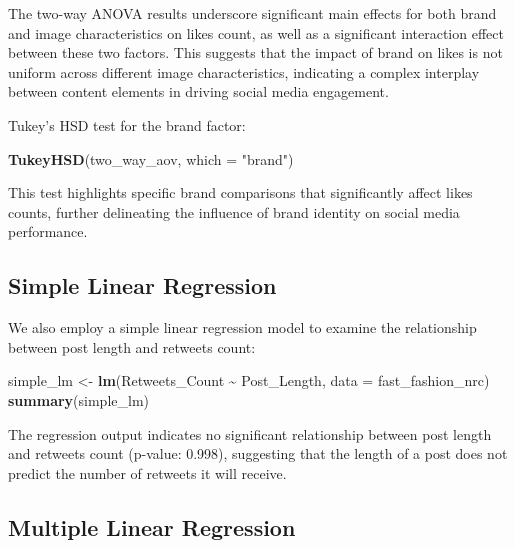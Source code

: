 \documentclass[
]{book}
\newenvironment{Shaded}{\begin{snugshade}}{\end{snugshade}}
\newcommand{\AttributeTok}[1]{\textcolor[rgb]{0.13,0.29,0.53}{#1}}
\newcommand{\FunctionTok}[1]{\textcolor[rgb]{0.13,0.29,0.53}{\textbf{#1}}}
\newcommand{\NormalTok}[1]{#1}
\newcommand{\OtherTok}[1]{\textcolor[rgb]{0.56,0.35,0.01}{#1}}
\newcommand{\SpecialCharTok}[1]{\textcolor[rgb]{0.81,0.36,0.00}{\textbf{#1}}}
\newcommand{\StringTok}[1]{\textcolor[rgb]{0.31,0.60,0.02}{#1}}
\begin{document}
The two-way ANOVA results underscore significant main effects for both brand and image characteristics on likes count, as well as a significant interaction effect between these two factors. This suggests that the impact of brand on likes is not uniform across different image characteristics, indicating a complex interplay between content elements in driving social media engagement.

Tukey's HSD test for the brand factor:

\begin{Shaded}
\begin{Highlighting}[]
\FunctionTok{TukeyHSD}\NormalTok{(two\_way\_aov, }\AttributeTok{which =} \StringTok{"brand"}\NormalTok{)}
\end{Highlighting}
\end{Shaded}

This test highlights specific brand comparisons that significantly affect likes counts, further delineating the influence of brand identity on social media performance.

\hypertarget{simple-linear-regression}{%
\subsection{Simple Linear Regression}\label{simple-linear-regression}}

We also employ a simple linear regression model to examine the relationship between post length and retweets count:

\begin{Shaded}
\begin{Highlighting}[]
\NormalTok{simple\_lm }\OtherTok{\textless{}{-}} \FunctionTok{lm}\NormalTok{(Retweets\_Count }\SpecialCharTok{\textasciitilde{}}\NormalTok{ Post\_Length, }\AttributeTok{data =}\NormalTok{ fast\_fashion\_nrc)}
\FunctionTok{summary}\NormalTok{(simple\_lm)}
\end{Highlighting}
\end{Shaded}

The regression output indicates no significant relationship between post length and retweets count (p-value: 0.998), suggesting that the length of a post does not predict the number of retweets it will receive.

\hypertarget{multiple-linear-regression}{%
\subsection{Multiple Linear Regression}\label{multiple-linear-regression}}
\end{document}
